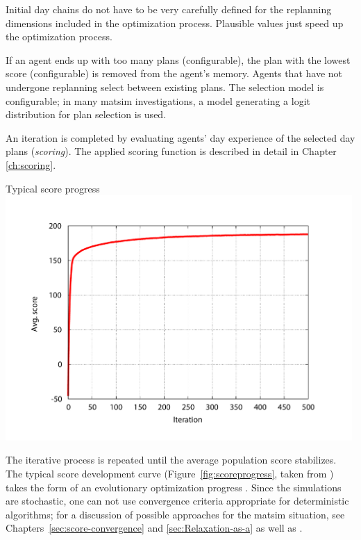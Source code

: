 Initial day chains do not have to be very carefully defined for the replanning dimensions included in the optimization process. Plausible values just speed up the optimization process. 

If an agent ends up with too many plans (configurable), the plan with the lowest score (configurable) is removed from the agent's memory. Agents that have not undergone replanning select between existing plans. The selection model is configurable; in many \gls{matsim} investigations, a model generating a logit distribution for plan selection is used.

An iteration is completed by evaluating agents' day experience of the selected day plans (\emph{scoring}). The applied scoring function is described in detail in Chapter \ref{ch:scoring}.

%
{Typical score progress}%
{\label{fig:scoreprogress}}%
{\includegraphics[width=0.99\textwidth, angle=0]{using/figures/scores.pdf}}%
{}

The iterative process is repeated until the average population score stabilizes.
The typical score development curve (Figure~\ref{fig:scoreprogress}, taken from \citet[][]{HorniEtAl_TRR_2009}) takes the form of an evolutionary optimization progress \citep[][Figure~2.5]{EibenSmithJE_2003}.  Since the simulations are stochastic, one can not use convergence criteria appropriate for deterministic algorithms; for a discussion of possible approaches for the \gls{matsim} situation, see Chapters~\ref{sec:score-convergence} and \ref{sec:Relaxation-as-a} as well as \citet{Meister_PhDThesis_2011}.

